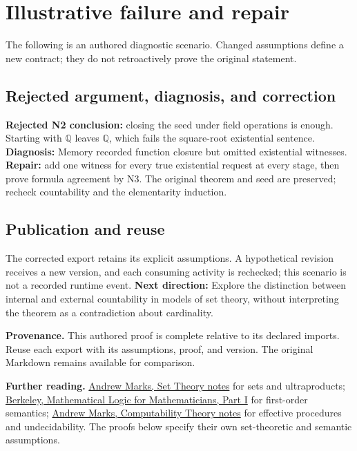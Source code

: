 \documentclass[preprint,12pt,aps,pra,showkeys,amsmath,amssymb,superscriptaddress,floatfix]{revtex4-2}
\theoremstyle{definition}
\theoremstyle{remark}
\begin{document}
\section{Illustrative failure and repair}

The following is an authored diagnostic scenario. Changed assumptions
define a new contract; they do not retroactively prove the original
statement.

\subsection{Rejected argument, diagnosis, and correction}
\textbf{Rejected N2 conclusion:} closing the seed under field operations
is enough. Starting with \(\mathbb Q\) leaves \(\mathbb Q\), which fails
the square-root existential sentence. \textbf{Diagnosis:} Memory
recorded function closure but omitted existential witnesses.
\textbf{Repair:} add one witness for every true existential request at
every stage, then prove formula agreement by N3. The original theorem
and seed are preserved; recheck countability and the elementarity
induction.

\subsection{Publication and reuse}
The corrected export retains its explicit assumptions. A hypothetical
revision receives a new version, and each consuming activity is
rechecked; this scenario is not a recorded runtime event. \textbf{Next
direction:} Explore the distinction between internal and external
countability in models of set theory, without interpreting the theorem
as a contradiction about cardinality.

\par\medskip\begingroup\small\linespread{1.0}\selectfont\noindent\textbf{Provenance.} This authored proof is complete relative to its declared imports. Reuse
each export with its assumptions, proof, and version. The original
Markdown remains available for comparison.
\par\endgroup

\par\smallskip\begingroup\small\linespread{1.0}\selectfont\noindent\textbf{Further reading.} \href{https://math.berkeley.edu/~marks/notes/set_theory_notes_4.pdf}{Andrew
Marks, Set Theory notes} for sets and ultraproducts;
\href{https://math.berkeley.edu/~antonio/math125A/mathlogicP1.pdf}{Berkeley,
Mathematical Logic for Mathematicians, Part I} for first-order
semantics;
\href{https://math.berkeley.edu/~marks/notes/computability_notes_v1.pdf}{Andrew
Marks, Computability Theory notes} for effective procedures and
undecidability. The proofs below specify their own set-theoretic and
semantic assumptions.\par\endgroup
\end{document}
